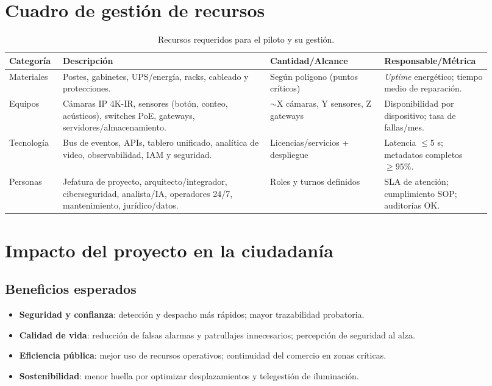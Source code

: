 \documentclass[12pt,a4paper]{article}
\begin{document}
\section{Cuadro de gestión de recursos}

\begin{table}[htbp]
\centering
\caption{Recursos requeridos para el piloto y su gestión.}
\begin{tabular}{p{0.1\linewidth} p{0.40\linewidth} p{0.22\linewidth} p{0.20\linewidth}}
\hline
\textbf{Categoría} & \textbf{Descripción} & \textbf{Cantidad/Alcance} & \textbf{Responsable/Métrica} \\
\hline
Materiales & Postes, gabinetes, UPS/energía, racks, cableado y protecciones. & Según polígono (puntos críticos) & \textit{Uptime} energético; tiempo medio de reparación. \\
Equipos & Cámaras IP 4K-IR, sensores (botón, conteo, acústicos), switches PoE, gateways, servidores/almacenamiento. & \(\sim\)X cámaras, Y sensores, Z gateways & Disponibilidad por dispositivo; tasa de fallas/mes. \\
Tecnología & Bus de eventos, APIs, tablero unificado, analítica de video, observabilidad, IAM y seguridad. & Licencias/servicios + despliegue & Latencia \(\leq 5\) s; metadatos completos \(\geq 95\%\). \\
Personas & Jefatura de proyecto, arquitecto/integrador, ciberseguridad, analista/IA, operadores 24/7, mantenimiento, jurídico/datos. & Roles y turnos definidos & SLA de atención; cumplimiento SOP; auditorías OK. \\
\hline
\end{tabular}
\end{table}

\section{Impacto del proyecto en la ciudadanía}

\subsection*{Beneficios esperados}
\begin{itemize}
  \item \textbf{Seguridad y confianza}: detección y despacho más rápidos; mayor trazabilidad probatoria.
  \item \textbf{Calidad de vida}: reducción de falsas alarmas y patrullajes innecesarios; percepción de seguridad al alza.
  \item \textbf{Eficiencia pública}: mejor uso de recursos operativos; continuidad del comercio en zonas críticas.
  \item \textbf{Sostenibilidad}: menor huella por optimizar desplazamientos y telegestión de iluminación.
\end{itemize}
\end{document}
